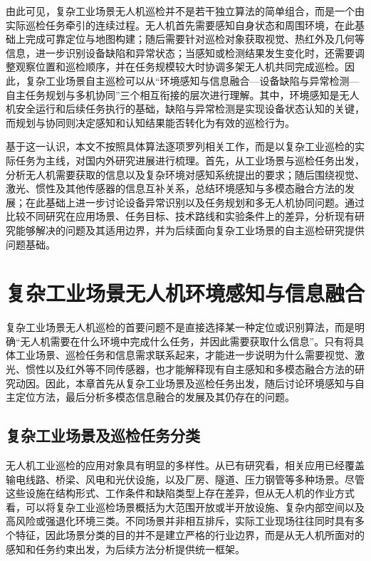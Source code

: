 由此可见，复杂工业场景无人机巡检并不是若干独立算法的简单组合，而是一个由实际巡检任务牵引的连续过程。无人机首先需要感知自身状态和周围环境，在此基础上完成可靠定位与地图构建；随后需要针对巡检对象获取视觉、热红外及几何等信息，进一步识别设备缺陷和异常状态；当感知或检测结果发生变化时，还需要调整观察位置和巡检顺序，并在任务规模较大时协调多架无人机共同完成巡检。因此，复杂工业场景自主巡检可以从“环境感知与信息融合—设备缺陷与异常检测—自主任务规划与多机协同”三个相互衔接的层次进行理解。其中，环境感知是无人机安全运行和后续任务执行的基础，缺陷与异常检测是实现设备状态认知的关键，而规划与协同则决定感知和认知结果能否转化为有效的巡检行为。

基于这一认识，本文不按照具体算法逐项罗列相关工作，而是以复杂工业巡检的实际任务为主线，对国内外研究进展进行梳理。首先，从工业场景与巡检任务出发，分析无人机需要获取的信息以及复杂环境对感知系统提出的要求；随后围绕视觉、激光、惯性及其他传感器的信息互补关系，总结环境感知与多模态融合方法的发展；在此基础上进一步讨论设备异常识别以及任务规划和多无人机协同问题。通过比较不同研究在应用场景、任务目标、技术路线和实验条件上的差异，分析现有研究能够解决的问题及其适用边界，并为后续面向复杂工业场景的自主巡检研究提供问题基础。

\section{复杂工业场景无人机环境感知与信息融合}

复杂工业场景无人机巡检的首要问题不是直接选择某一种定位或识别算法，而是明确“无人机需要在什么环境中完成什么任务，并因此需要获取什么信息”。只有将具体工业场景、巡检任务和信息需求联系起来，才能进一步说明为什么需要视觉、激光、惯性以及红外等不同传感器，也才能解释现有自主感知和多模态融合方法的研究动因。因此，本章首先从复杂工业场景及巡检任务出发，随后讨论环境感知与自主定位方法，最后分析多模态信息融合的发展及其仍存在的问题。

\subsection{复杂工业场景及巡检任务分类}

无人机工业巡检的应用对象具有明显的多样性。从已有研究看，相关应用已经覆盖输电线路、桥梁、风电和光伏设施，以及厂房、隧道、压力钢管等多种场景\cite{nguyen2018automatic,miao2020uav,zhouwq2024review,morgenthal2014quality,dorafshan2018bridge,ozaslan2017autonomous}。尽管这些设施在结构形式、工作条件和缺陷类型上存在差异，但从无人机的作业方式看，可以将复杂工业巡检场景概括为大范围开放或半开放设施、复杂内部空间以及高风险或强退化环境三类。不同场景并非相互排斥，实际工业现场往往同时具有多个特征，因此场景分类的目的并不是建立严格的行业边界，而是从无人机所面对的感知和任务约束出发，为后续方法分析提供统一框架。

